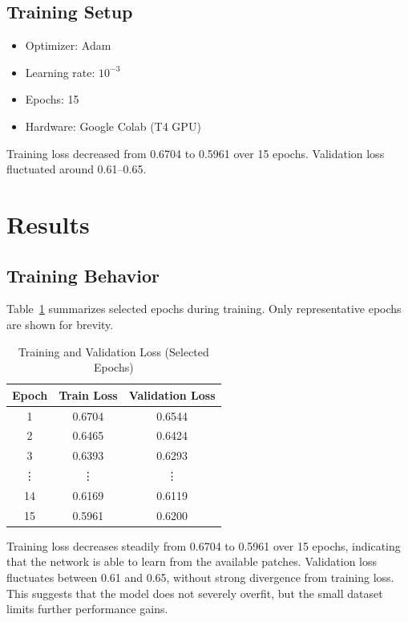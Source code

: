 \documentclass[conference]{IEEEtran}
\begin{document}
\subsection{Training Setup}

\begin{itemize}
    \item Optimizer: Adam
    \item Learning rate: $10^{-3}$
    \item Epochs: 15
    \item Hardware: Google Colab (T4 GPU)
\end{itemize}

Training loss decreased from 0.6704 to 0.5961 over 15 epochs. Validation loss fluctuated around 0.61--0.65.

\section{Results}

\subsection{Training Behavior}

Table~\ref{tab:training} summarizes selected epochs during training. Only representative epochs are shown for brevity.

\begin{table}[H]
\centering
\caption{Training and Validation Loss (Selected Epochs)}
\label{tab:training}
\begin{tabular}{ccc}
\toprule
Epoch & Train Loss & Validation Loss \\
\midrule
1  & 0.6704 & 0.6544 \\
2  & 0.6465 & 0.6424 \\
3  & 0.6393 & 0.6293 \\
\vdots & \vdots & \vdots \\
14 & 0.6169 & 0.6119 \\
15 & 0.5961 & 0.6200 \\
\bottomrule
\end{tabular}
\end{table}

Training loss decreases steadily from 0.6704 to 0.5961 over 15 epochs, indicating that the network is able to learn from the available patches. Validation loss fluctuates between 0.61 and 0.65, without strong divergence from training loss. This suggests that the model does not severely overfit, but the small dataset limits further performance gains.
\end{document}
